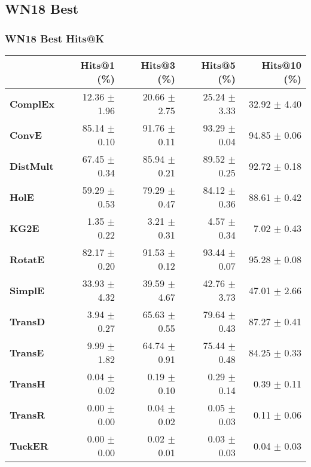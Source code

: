 \documentclass{article}
\begin{document}
\subsection{WN18 Best}
\subsubsection{WN18 Best Hits@K}
    \begin{center}
    \begin{tabular}{lrrrr}
\toprule
{} &   Hits@1 (\%) &   Hits@3 (\%) &   Hits@5 (\%) &  Hits@10 (\%) \\
\midrule
\textbf{ComplEx } &  12.36 $\pm$ 1.96 &  20.66 $\pm$ 2.75 &  25.24 $\pm$ 3.33 &  32.92 $\pm$ 4.40 \\
\textbf{ConvE   } &  85.14 $\pm$ 0.10 &  91.76 $\pm$ 0.11 &  93.29 $\pm$ 0.04 &  94.85 $\pm$ 0.06 \\
\textbf{DistMult} &  67.45 $\pm$ 0.34 &  85.94 $\pm$ 0.21 &  89.52 $\pm$ 0.25 &  92.72 $\pm$ 0.18 \\
\textbf{HolE    } &  59.29 $\pm$ 0.53 &  79.29 $\pm$ 0.47 &  84.12 $\pm$ 0.36 &  88.61 $\pm$ 0.42 \\
\textbf{KG2E    } &  $\phantom{5}$1.35 $\pm$ 0.22 &  $\phantom{5}$3.21 $\pm$ 0.31 &  $\phantom{5}$4.57 $\pm$ 0.34 &  $\phantom{5}$7.02 $\pm$ 0.43 \\
\textbf{RotatE  } &  82.17 $\pm$ 0.20 &  91.53 $\pm$ 0.12 &  93.44 $\pm$ 0.07 &  95.28 $\pm$ 0.08 \\
\textbf{SimplE  } &  33.93 $\pm$ 4.32 &  39.59 $\pm$ 4.67 &  42.76 $\pm$ 3.73 &  47.01 $\pm$ 2.66 \\
\textbf{TransD  } &  $\phantom{5}$3.94 $\pm$ 0.27 &  65.63 $\pm$ 0.55 &  79.64 $\pm$ 0.43 &  87.27 $\pm$ 0.41 \\
\textbf{TransE  } &  $\phantom{5}$9.99 $\pm$ 1.82 &  64.74 $\pm$ 0.91 &  75.44 $\pm$ 0.48 &  84.25 $\pm$ 0.33 \\
\textbf{TransH  } &  $\phantom{5}$0.04 $\pm$ 0.02 &  $\phantom{5}$0.19 $\pm$ 0.10 &  $\phantom{5}$0.29 $\pm$ 0.14 &  $\phantom{5}$0.39 $\pm$ 0.11 \\
\textbf{TransR  } &  $\phantom{5}$0.00 $\pm$ 0.00 &  $\phantom{5}$0.04 $\pm$ 0.02 &  $\phantom{5}$0.05 $\pm$ 0.03 &  $\phantom{5}$0.11 $\pm$ 0.06 \\
\textbf{TuckER  } &  $\phantom{5}$0.00 $\pm$ 0.00 &  $\phantom{5}$0.02 $\pm$ 0.01 &  $\phantom{5}$0.03 $\pm$ 0.03 &  $\phantom{5}$0.04 $\pm$ 0.03 \\
\bottomrule
\end{tabular}

    \end{center}
\end{document}

